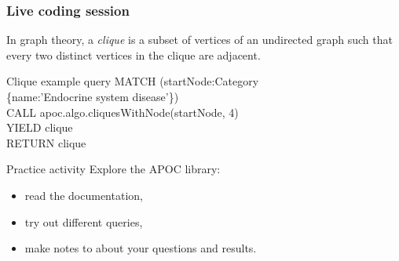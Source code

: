 \documentclass[12pt]{beamer}
\begin{document}
    \begin{frame}
        \frametitle{Live coding session}
        \begin{Definition}
            In graph theory, a \emph{clique} is a subset of vertices of an undirected graph such that every two distinct vertices in the clique are adjacent.
        \end{Definition}
        \begin{block}{Clique example query}
        MATCH (startNode:Category\\
        \hspace{3cm} \{name:'Endocrine system disease'\})\\
        \hspace{1cm} CALL apoc.algo.cliquesWithNode(startNode, 4)\\
        \hspace{1cm} YIELD clique\\
        RETURN clique
        \end{block}
    \end{frame}
    
    \begin{frame}{Practice activity}
        Explore the APOC library:
        \begin{itemize}
            \item read the documentation,
            \item try out different queries,
            \item make notes to about your questions and results.
        \end{itemize}
    \end{frame}
    
\end{document}
